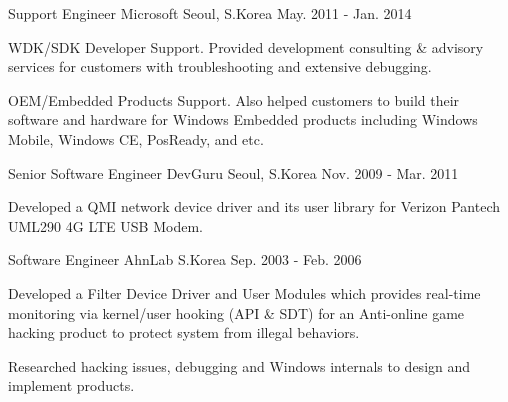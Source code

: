 \begin{cventries}
  \cventry
    {Support Engineer} %
    {Microsoft} %
    {Seoul, S.Korea} %
    {May. 2011 - Jan. 2014} %
    {
      \begin{cvitems} %
        \item {WDK/SDK Developer Support. Provided development consulting \& advisory services for customers with troubleshooting and extensive debugging.}
        \item {OEM/Embedded Products Support. Also helped customers to build their software and hardware for Windows Embedded products including Windows Mobile, Windows CE, PosReady, and etc.}
      \end{cvitems} 
    }

  \cventry
    {Senior Software Engineer} %
    {DevGuru} %
    {Seoul, S.Korea} %
    {Nov. 2009 - Mar. 2011} %
    {
      \begin{cvitems} %
        \item {Developed a QMI network device driver and its user library for Verizon Pantech UML290 4G LTE USB Modem.}
      \end{cvitems}
    }

  \cventry
    {Software Engineer} %
    {AhnLab} %
    {S.Korea} %
    {Sep. 2003 - Feb. 2006} %
    {
      \begin{cvitems} %
        \item {Developed a Filter Device Driver and User Modules which provides real-time monitoring via kernel/user hooking (API \& SDT) for an Anti-online game hacking product to protect system from illegal behaviors.}
        \item {Researched hacking issues, debugging and Windows internals to design and implement products.}
      \end{cvitems}
    }


\end{cventries}
